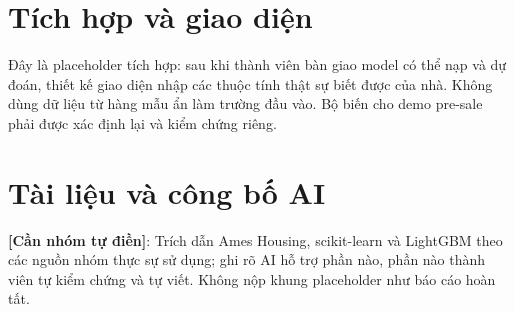 \documentclass[12pt,a4paper]{article}
\begin{document}
\section{Tích hợp và giao diện}
Đây là placeholder tích hợp: sau khi thành viên bàn giao model có thể nạp và dự đoán, thiết kế giao diện nhập các thuộc tính thật sự biết được của nhà. Không dùng dữ liệu từ hàng mẫu ẩn làm trường đầu vào. Bộ biến cho demo pre-sale phải được xác định lại và kiểm chứng riêng.
\section{Tài liệu và công bố AI}
\textbf{[Cần nhóm tự điền]}: Trích dẫn Ames Housing, scikit-learn và LightGBM theo các nguồn nhóm thực sự sử dụng; ghi rõ AI hỗ trợ phần nào, phần nào thành viên tự kiểm chứng và tự viết. Không nộp khung placeholder như báo cáo hoàn tất.
\end{document}
